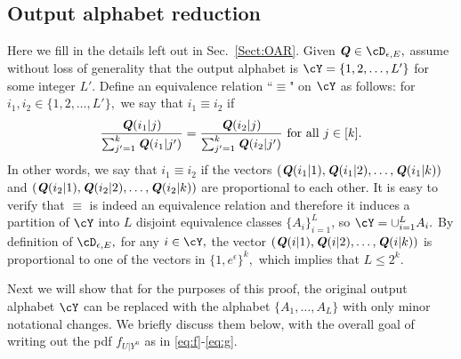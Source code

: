\documentclass[11pt,onecolumn]{IEEEtran}
\def\mathbi#1{{\textbf{\textit #1}}}
\begin{document}
\subsection{Output alphabet reduction}\label{Sect:merge}
Here we fill in the details left out in Sec.~\ref{Sect:OAR}.
Given $\mathbi{Q}\in \cD_{\epsilon,E},$ assume without loss of generality that the output alphabet is $\cY=\{1,2,\dots,L'\}$ for some integer $L'.$  Define an equivalence relation
``$\equiv$" on $\cY$ as follows: 
for $i_1,i_2\in\{1,2,\dots,L'\},$ we say that $i_1 \equiv i_2$ if 
\begin{equation}\label{eq:eqv}
\frac{\mathbi{Q}(i_1|j)}{\sum_{j'=1}^k \mathbi{Q}(i_1|j')}
= \frac{\mathbi{Q}(i_2|j)}{\sum_{j'=1}^k \mathbi{Q}(i_2|j')}
\text{~for all~} j\in[k].
\end{equation}
In other words, we say that $i_1 \equiv i_2$ if the vectors $(\mathbi{Q}(i_1|1), \mathbi{Q}(i_1|2), \dots, \mathbi{Q}(i_1|k))$ and $(\mathbi{Q}(i_2|1), \mathbi{Q}(i_2|2), \linebreak[4]  \dots, \mathbi{Q}(i_2|k))$ are proportional to each other.
It is easy to verify that $\equiv$ is indeed an equivalence relation and therefore it induces a partition of $\cY$ into $L$ disjoint equivalence classes $\{A_i\}_{i=1}^L$, so $\cY=\cup_{i=1}^L A_i.$ By definition of $\cD_{\epsilon,E},$ for any $i\in\cY,$ the vector 
$(\mathbi{Q}(i|1), \mathbi{Q}(i|2), \dots, \mathbi{Q}(i|k))$ is proportional to one of the vectors in $\{1,e^{\epsilon}\}^k,$ which implies that $L\le 2^k.$ 

Next we will show that for the purposes of this proof,
the original output alphabet $\cY$ can be replaced with the alphabet $\{A_1,\dots,A_L\}$ with only minor notational changes.
We briefly discuss them below, with the overall goal of writing out the pdf $f_{U|Y^n}$ as in \eqref{eq:f}-\eqref{eq:g}.
\end{document}
